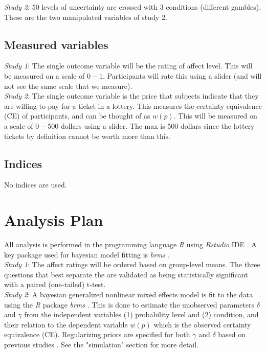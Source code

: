 \documentclass[12pt]{article}
\begin{document}
\emph{Study 2}: $50$ levels of uncertainty are
crossed with  $3$ conditions (different gambles).
These are the two manipulated variables of
study 2.

\subsection{Measured variables}

\emph{Study 1}: The single outcome variable
will be the rating of affect level. This will
be measured on a scale of $0-1$. Participants
will rate this using a slider (and will not see
the same scale that we measure). \\

\emph{Study 2}: The single outcome variable
is the price that subjects indicate that they
are willing to pay for a ticket in a lottery.
This measures the certainty equivalence (CE) of
participants, and can be thought of as $w(p)$.
This will be measured on a scale of $0-500$ dollars
using a slider. The max is 500 dollars since the
lottery tickets by definition cannot be worth
more than this.

\subsection{Indices}

No indices are used.

\section{Analysis Plan}

All analysis is performed in the programming
language \emph{R} \autocite{rcore} using
\emph{Rstudio} IDE
\autocite{rstudio}. A key package used for
bayesian model fitting is \emph{brms}
\autocite{brms}. \\

\emph{Study 1}: The affect ratings will be
ordered based on group-level means. The
three questions that best separate the
are validated as being statistically significant
with a paired (one-tailed) t-test. \\

\emph{Study 2}: A bayesian generalized nonlinear
mixed effects model is fit to the data using the
\emph{R} package \emph{brms} \autocite{brms}.
This is done to estimate the unobserved parameters
$\delta$ and $\gamma$ from the independent variables
(1) probability level and (2) condition,
and their relation to the dependent variable
$w(p)$ which is the observed certainty equivalence (CE).
Regularizing priors are specified for both
$\gamma$ and $\delta$ based on previous studies
\autocite{gonzalez1999shape}. See the "simulation"
section for more detail.
\end{document}
